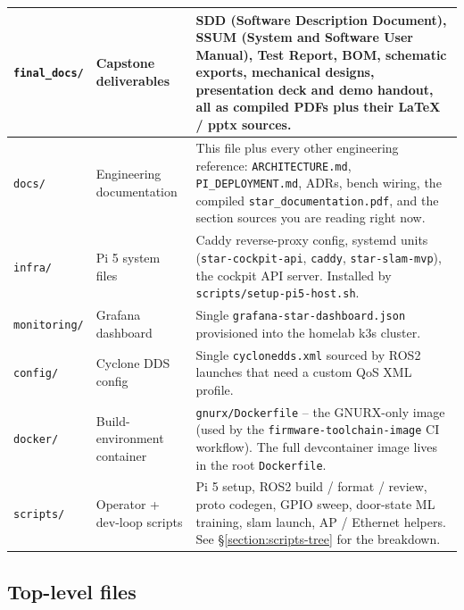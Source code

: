 \begin{center}
\begin{tabular}{|p{3.2cm}|p{4.0cm}|p{7.5cm}|}
\hline
\texttt{final\_docs/}         & Capstone deliverables                    & SDD (Software Description Document), SSUM (System and Software User Manual), Test Report, BOM, schematic exports, mechanical designs, presentation deck and demo handout, all as compiled PDFs plus their LaTeX / pptx sources. \\
\hline
\texttt{docs/}                & Engineering documentation                & This file plus every other engineering reference: \texttt{ARCHITECTURE.md}, \texttt{PI\_DEPLOYMENT.md}, ADRs, bench wiring, the compiled \texttt{star\_documentation.pdf}, and the section sources you are reading right now. \\
\hline
\texttt{infra/}               & Pi 5 system files                        & Caddy reverse-proxy config, systemd units (\texttt{star-cockpit-api}, \texttt{caddy}, \texttt{star-slam-mvp}), the cockpit API server. Installed by \texttt{scripts/setup-pi5-host.sh}. \\
\hline
\texttt{monitoring/}          & Grafana dashboard                        & Single \texttt{grafana-star-dashboard.json} provisioned into the homelab k3s cluster. \\
\hline
\texttt{config/}              & Cyclone DDS config                       & Single \texttt{cyclonedds.xml} sourced by ROS2 launches that need a custom QoS XML profile. \\
\hline
\texttt{docker/}              & Build-environment container              & \texttt{gnurx/Dockerfile} -- the GNURX-only image (used by the \texttt{firmware-toolchain-image} CI workflow). The full devcontainer image lives in the root \texttt{Dockerfile}. \\
\hline
\texttt{scripts/}             & Operator + dev-loop scripts              & Pi 5 setup, ROS2 build / format / review, proto codegen, GPIO sweep, door-state ML training, slam launch, AP / Ethernet helpers. See \S\ref{section:scripts-tree} for the breakdown. \\
\hline
\end{tabular}
\end{center}

\subsection{Top-level files}

